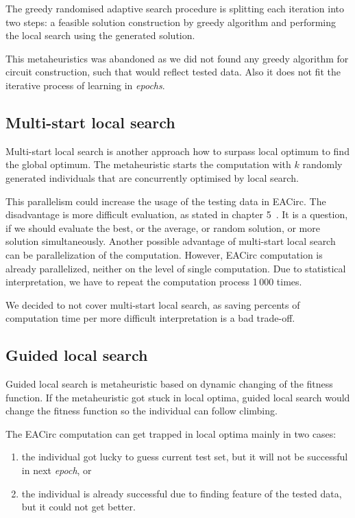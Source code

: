 \documentclass[
  print, %
  Table,   %
  nolof,     %
  nolot,     %
  11pt, %
  oneside  %
]{fithesis3}
\begin{document}
The greedy randomised adaptive search procedure is splitting each iteration into two steps: a feasible solution construction by greedy algorithm and performing the local search using the generated solution.

This metaheuristics was abandoned as we did not found any greedy algorithm for circuit construction, such that would reflect tested data. Also it does not fit the iterative process of learning in \textit{epochs}.

\subsection{Multi-start local search}
\label{subsec:opt-single-sol-msls}

Multi-start local search is another approach how to surpass local optimum to find the global optimum. The metaheuristic starts the computation with $k$ randomly generated individuals that are concurrently optimised by local search.

This parallelism could increase the usage of the testing data in EACirc. The disadvantage is more difficult evaluation, as stated in chapter 5~\cite{ukropBcThesis}. It is a question, if we should evaluate the best, or the average, or random solution, or more solution simultaneously. Another possible advantage of multi-start local search can be parallelization of the computation. However, EACirc computation is already parallelized, neither on the level of single computation. Due to statistical interpretation, we have to repeat the computation process 1\,000 times.

We decided to not cover multi-start local search, as saving percents of computation time per more difficult interpretation is a bad trade-off.

\subsection{Guided local search}
\label{subsec:opt-single-sol-gls}

Guided local search is metaheuristic based on dynamic changing of the fitness function. If the metaheuristic got stuck in local optima, guided local search would change the fitness function so the individual can follow climbing.

The EACirc computation can get trapped in local optima mainly in two cases:

\begin{enumerate}[noitemsep,topsep=3pt,parsep=3pt,partopsep=3pt]
    \item the individual got lucky to guess current test set, but it will not be successful in next \textit{epoch}, or
    \item the individual is already successful due to finding feature of the tested data, but it could not get better.
\end{enumerate}
\end{document}

